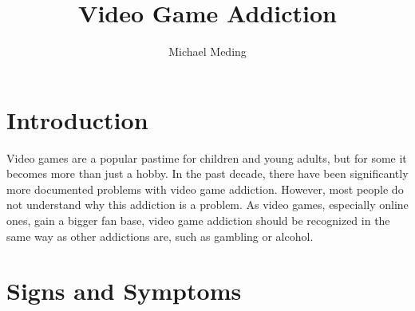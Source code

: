 \documentclass[a4paper,man,natbib]{apa6}
\title{Video Game Addiction}
\author{Michael Meding}
\affiliation{University of Massachusetts Lowell}
\renewcommand{\paragraph}{}
\begin{document}
\maketitle

\section{Introduction}

\paragraph{}	Video games are a popular pastime for children and young adults, but for some it becomes more than just a hobby. In the past decade, there have been significantly more documented problems with video game addiction. However, most people do not understand why this addiction is a problem. As video games, especially online ones, gain a bigger fan base, video game addiction should be recognized in the same way as other addictions are, such as gambling or alcohol.

\section{Signs and Symptoms}
\end{document}
